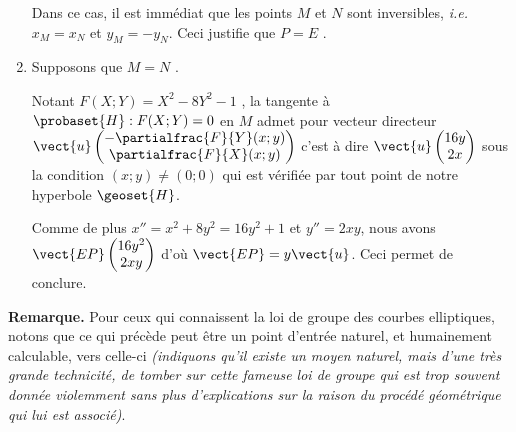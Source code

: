 \begin{enumerate}
	\smallskip
	
	\noindent
	Dans ce cas, il est immédiat que les points $M$ et $N$ sont inversibles, \emph{i.e.} $x_M = x_N$ et $y_M = -y_N$.
	Ceci justifie que $P = E$ .


	\medskip
	\item Supposons que $M = N$ .
	
	\smallskip
	
	\noindent
	Notant $F(X ; Y) = X^2 - 8 Y^2 - 1$ , la tangente à $\probaset{H} : F(X ; Y) = 0$ en $M$ admet pour vecteur directeur
	$\vect{u} \begin{pmatrix} 
	  - \partialfrac{F}{Y}(x ; y)    \\ 
	  \partialfrac{F}{X}(x ; y) 
	\end{pmatrix}$
	c'est à dire
	$\vect{u} \begin{pmatrix} 
	  16y    \\ 
	  2x 
	\end{pmatrix}$
	sous la condition $(x ; y) \neq (0 ; 0)$ qui est vérifiée par tout point de notre hyperbole $\geoset{H}$. 
	
	
	\noindent
	Comme de plus $x'' = x^2 + 8y^2 = 16y^2 + 1$ et $y'' = 2xy$, nous avons
	$\vect{EP} \begin{pmatrix} 
	  16y^2    \\ 
	  2xy
	\end{pmatrix}$
	d'où
	$\vect{EP} = y \vect{u}$.
	Ceci permet de conclure.
\end{enumerate}



\bigskip

\textbf{Remarque.} Pour ceux qui connaissent la loi de groupe des courbes elliptiques, notons que ce qui précède peut être un point d'entrée naturel, et humainement calculable, vers celle-ci \textit{(indiquons qu'il existe un moyen naturel, mais d'une très grande technicité, de tomber sur cette fameuse loi de groupe qui est trop souvent donnée violemment sans plus d'explications sur la raison du procédé géométrique qui lui est associé)}.